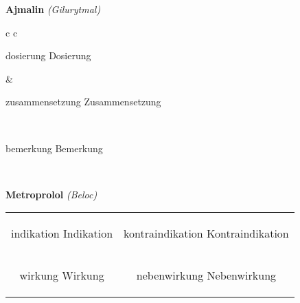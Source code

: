 \documentclass[12pt]{beamer}
\begin{document}
\begin{frame}{
    \textbf{Ajmalin}
    \textit{(Gilurytmal)}
}
    \begin{tabular}{c c}
        \begin{beamercolorbox}[wd=\boxwidth\textwidth,ht=\boxheight\textheight,sep=1em]{dosierung}
        Dosierung
        \end{beamercolorbox} & 
        \begin{beamercolorbox}[wd=\boxwidth\textwidth,ht=\boxheight\textheight,sep=1em]{zusammensetzung}
        Zusammensetzung
        \end{beamercolorbox} \\
        \begin{beamercolorbox}[wd=\textwidth,ht=\boxheight\textheight,sep=1em]{bemerkung}
        Bemerkung
        \end{beamercolorbox} \\
    \end{tabular}
\end{frame}

\begin{frame}{
    \textbf{Metroprolol}
    \textit{(Beloc)}
}
    \begin{tabular}{c c}
        \begin{beamercolorbox}[wd=\boxwidth\textwidth,ht=\boxheight\textheight,sep=1em]{indikation}
        Indikation
        \end{beamercolorbox} & 
        \begin{beamercolorbox}[wd=\boxwidth\textwidth,ht=\boxheight\textheight,sep=1em]{kontraindikation}
        Kontraindikation 
        \end{beamercolorbox} \\
        \begin{beamercolorbox}[wd=\boxwidth\textwidth,ht=\boxheight\textheight,sep=1em]{wirkung}
        Wirkung
        \end{beamercolorbox} & 
        \begin{beamercolorbox}[wd=\boxwidth\textwidth,ht=\boxheight\textheight,sep=1em]{nebenwirkung}
        Nebenwirkung
        \end{beamercolorbox} \\
    \end{tabular}
\end{frame}
\end{document}
